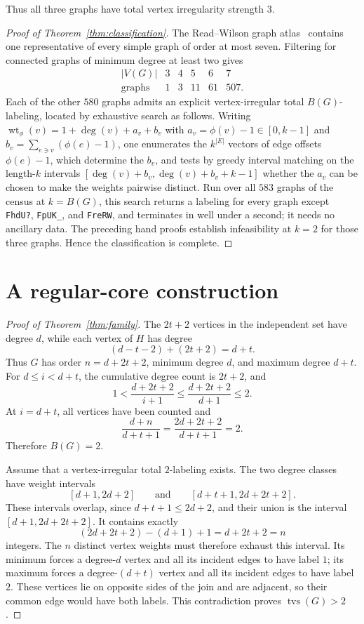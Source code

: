 \documentclass[11pt]{amsart}
\newcommand{\tvs}{\operatorname{tvs}}
\newcommand{\wt}{\operatorname{wt}}
\begin{document}
Thus all three graphs have total vertex irregularity strength $3$.

\begin{proof}[Proof of Theorem~\ref{thm:classification}]
The Read--Wilson graph atlas~\cite{ReadWilson1998} contains one
representative of every simple graph of order at most seven. Filtering for
connected graphs of minimum degree at least two gives
\[
\begin{array}{c|rrrrr}
|V(G)|&3&4&5&6&7\\
\hline
\text{graphs}&1&3&11&61&507.
\end{array}
\]
Each of the other $580$ graphs admits an explicit vertex-irregular total
$B(G)$-labeling, located by exhaustive search as follows. Writing
$\wt_\phi(v)=1+\deg(v)+a_v+b_v$ with $a_v=\phi(v)-1\in[0,k-1]$ and
$b_v=\sum_{e\ni v}(\phi(e)-1)$, one enumerates the $k^{|E|}$ vectors of
edge offsets $\phi(e)-1$, which determine the $b_v$, and tests by greedy
interval matching on the length-$k$ intervals
$[\deg(v)+b_v,\deg(v)+b_v+k-1]$ whether the $a_v$ can be chosen to make
the weights pairwise distinct. Run over all $583$ graphs of the census at
$k=B(G)$, this search returns a labeling for every graph except
\texttt{FhdU?}, \texttt{FpUK\_}, and \texttt{FreRW}, and terminates in
well under a second; it needs no ancillary data. The preceding hand
proofs establish infeasibility at $k=2$ for those three graphs. Hence the
classification is complete.
\end{proof}

\section{A regular-core construction}

\begin{proof}[Proof of Theorem~\ref{thm:family}]
The $2t+2$ vertices in the independent set have degree $d$, while each
vertex of $H$ has degree
\[
  (d-t-2)+(2t+2)=d+t.
\]
Thus $G$ has order $n=d+2t+2$, minimum degree $d$, and maximum degree
$d+t$. For $d\le i<d+t$, the cumulative degree count is $2t+2$, and
\[
  1<\frac{d+2t+2}{i+1}
  \le\frac{d+2t+2}{d+1}\le2.
\]
At $i=d+t$, all vertices have been counted and
\[
  \frac{d+n}{d+t+1}
  =\frac{2d+2t+2}{d+t+1}=2.
\]
Therefore $B(G)=2$.

Assume that a vertex-irregular total $2$-labeling exists. The two degree
classes have weight intervals
\[
  [d+1,2d+2]
  \qquad\text{and}\qquad
  [d+t+1,2d+2t+2].
\]
These intervals overlap, since $d+t+1\le2d+2$, and their union is the
interval $[d+1,2d+2t+2]$. It contains exactly
\[
  (2d+2t+2)-(d+1)+1=d+2t+2=n
\]
integers. The $n$ distinct vertex weights must therefore exhaust this
interval. Its minimum forces a degree-$d$ vertex and all its incident
edges to have label $1$; its maximum forces a degree-$(d+t)$ vertex and
all its incident edges to have label $2$. These vertices lie on opposite
sides of the join and are adjacent, so their common edge would have both
labels. This contradiction proves $\tvs(G)>2$.
\end{proof}
\end{document}
